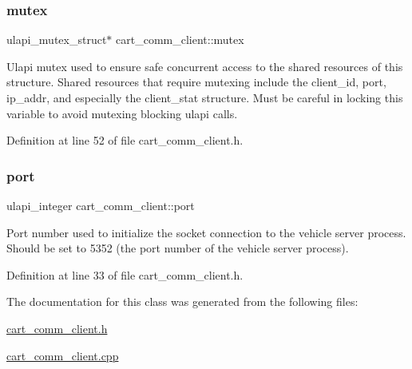 \subsubsection{\texorpdfstring{mutex}{mutex}}
{\footnotesize\ttfamily ulapi\+\_\+mutex\+\_\+struct$\ast$ cart\+\_\+comm\+\_\+client\+::mutex\hspace{0.3cm}{\ttfamily [private]}}

Ulapi mutex used to ensure safe concurrent access to the shared resources of this structure. Shared resources that require mutexing include the client\+\_\+id, port, ip\+\_\+addr, and especially the client\+\_\+stat structure. Must be careful in locking this variable to avoid mutexing blocking ulapi calls. 

Definition at line 52 of file cart\+\_\+comm\+\_\+client.\+h.

\mbox{\label{classcart__comm__client_ab7aaa2b3805ad44d18c97a094ef705d3}} 
\subsubsection{\texorpdfstring{port}{port}}
{\footnotesize\ttfamily ulapi\+\_\+integer cart\+\_\+comm\+\_\+client\+::port\hspace{0.3cm}{\ttfamily [private]}}

Port number used to initialize the socket connection to the vehicle server process. Should be set to 5352 (the port number of the vehicle server process). 

Definition at line 33 of file cart\+\_\+comm\+\_\+client.\+h.



The documentation for this class was generated from the following files\+:\begin{DoxyCompactItemize}
\item 
\mbox{\hyperlink{cart__comm__client_8h}{cart\+\_\+comm\+\_\+client.\+h}}\item 
\mbox{\hyperlink{cart__comm__client_8cpp}{cart\+\_\+comm\+\_\+client.\+cpp}}\end{DoxyCompactItemize}
